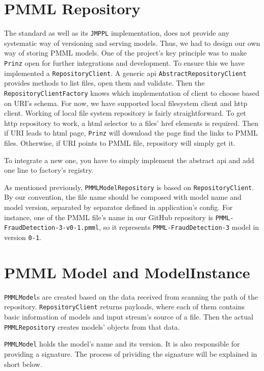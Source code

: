\section{PMML Repository}
\label{sec:pmml-repository}

The standard as well as its \texttt{JMPPL} implementation, does not provide any systematic way of versioning and serving models.
Thus, we had to design our own way of storing PMML models. One of the project’s key principle was
to make \texttt{Prinz} open for further integrations and development. To ensure this we have implemented a \texttt{RepositoryClient}.
A generic api \texttt{AbstractRepositoryClient} provides methods to list files, open them and validate. Then the \texttt{RepositoryClientFactory}
knows which implementation of client to choose based on URI’s schema. For now, we have supported local filesystem client and http client.
Working of local file system repository is fairly straightforward. To get http repository to work, a html selector to a files' href elements
is required. Then if URI leads to html page, \texttt{Prinz} will download the page find the links to PMML files. Otherwise, if URI points
to PMML file, repository will simply get it.

To integrate a new one, you have to simply implement the abstract api and add one line to factory’s registry.

As mentioned previously, \texttt{PMMLModelRepository} is based on \texttt{RepositoryClient}. By our convention,
the file name should be composed with model name and model version, separated by separator defined in application’s config.
For instance, one of the PMML file's name in our GitHub repository is \texttt{PMML-FraudDetection-3-v0-1.pmml}, so it represents
\texttt{PMML-FraudDetection-3} model in version \texttt{0-1}.

\section{PMML Model and ModelInstance}

\texttt{PMMLModel}s are created based on the data received from scanning the path of the repository.
\texttt{RepositoryClient} returns payloads, where each of them contains basic information of models and input stream's source of a file.
Then the actual \texttt{PMMLRepository} creates models’ objects from that data.

\texttt{PMMLModel} holds the model’s name and its version. It is also responsible for providing a signature. The process of prividing the signature will
be explained in short below.


